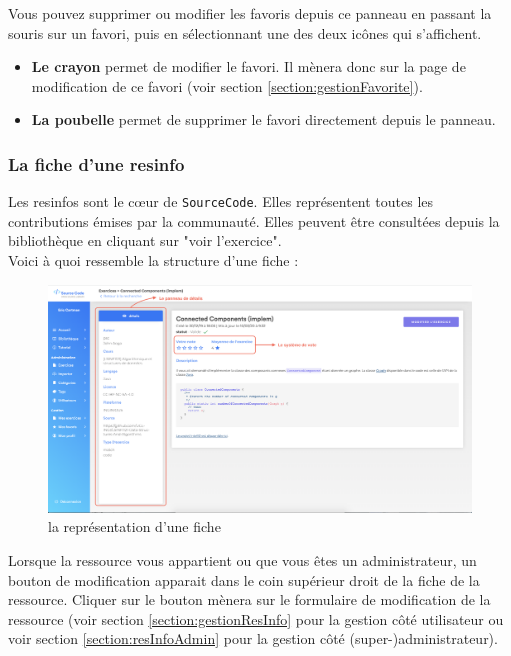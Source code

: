 Vous pouvez supprimer ou modifier les favoris depuis ce panneau en passant la souris sur un favori, puis en sélectionnant une des deux icônes qui s'affichent.

\begin{itemize}
    \item \textbf{Le crayon} permet de modifier le favori. Il mènera donc sur la page de modification de ce favori (voir section \ref{section:gestionFavorite}).
    \item \textbf{La poubelle} permet de supprimer le favori directement depuis le panneau.
\end{itemize}

\subsubsection{La \gls{fiche} d’une \gls{resinfo}}
\label{section:ficheResInfo}

Les \glspl{resinfo} sont le cœur de \texttt{SourceCode}. Elles représentent toutes les contributions émises par la communauté. Elles peuvent être consultées depuis la bibliothèque en cliquant sur "voir l'exercice".\\

Voici à quoi ressemble la structure d'une \gls{fiche} :

\begin{figure}[H]
    \includegraphics[width=\textwidth,height=\textheight,keepaspectratio]{images/client/fiche.png}
    \centering
    \caption[SourceCode : la représentation d'une \gls{fiche}]{la représentation d'une \gls{fiche}}
\end{figure}

Lorsque la ressource vous appartient ou que vous êtes un administrateur, un bouton de modification apparait dans le coin supérieur droit de la \gls{fiche} de la ressource. Cliquer sur le bouton mènera sur le formulaire de modification de la ressource (voir section \ref{section:gestionResInfo} pour la gestion côté utilisateur ou voir section \ref{section:resInfoAdmin} pour la gestion côté (super-)administrateur).\\

